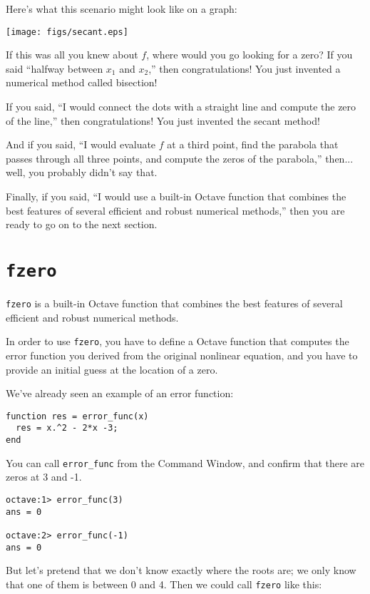 Here's what this scenario might look like on a graph:

\beforefig \centerline{\texttt{[image: figs/secant.eps]}}

If this was all you knew about $f$, where would you go looking for
a zero? If you said ``halfway between $x_1$ and $x_2$,'' then
congratulations! You just invented a numerical method called
bisection!

If you said, ``I would connect the dots with a straight line
and compute the zero of the line,'' then
congratulations! You just invented the secant method!

And if you said, ``I would evaluate $f$ at a third point, find the
parabola that passes through all three points, and compute the zeros
of the parabola,'' then... well, you probably didn't say that.

Finally, if you said, ``I would use a built-in Octave function that
combines the best features of several efficient and robust
numerical methods,'' then you are ready to go on to the next section.


\section{{\tt fzero}}
\label{fzero}

{\tt fzero} is a built-in Octave function that
combines the best features of several efficient and robust
numerical methods.

In order to use {\tt fzero}, you have to define a Octave function
that computes the error function you derived from the original
nonlinear equation, and you have to provide an initial guess at
the location of a zero.

We've already seen an example of an error function:

\begin{verbatim}
function res = error_func(x)
  res = x.^2 - 2*x -3;
end
\end{verbatim}

You can call {\tt error\_func} from the Command Window, and
confirm that there are zeros at 3 and -1.

\begin{verbatim}
octave:1> error_func(3)
ans = 0

octave:2> error_func(-1)
ans = 0
\end{verbatim}

But let's pretend that we don't know exactly where
the roots are; we only know that one of them is between 0 and 4. Then
we could call {\tt fzero} like this:

